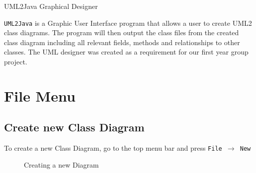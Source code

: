 \documentclass[a4paper]{article}
\begin{document}


\newcommand{\imagespace}[0]{\ \ \ \ \ \ \ }
\setlength\fboxsep{0pt}
\setlength\fboxrule{0.7pt}

\begin{center}\huge{UML2Java Graphical Designer}
\end{center}

\texttt{UML2Java} is a Graphic User Interface program that allows a user to create UML2 class diagrams. The program will then output the class files from the created class diagram including all relevant fields, methods and relationships to other classes. The UML designer was created as a requirement for our first year group project. 

\newpage
\tableofcontents 
\newpage

\section{File Menu} 

\subsection{Create new Class Diagram} 
To create a new Class Diagram, go to the top menu bar and press \texttt{File $\rightarrow$ New}
\begin{figure}[H] \begin{center} 
	\caption{Creating a new Diagram} \vspace{-20pt}
\end{center} \end{figure}
\end{document}
